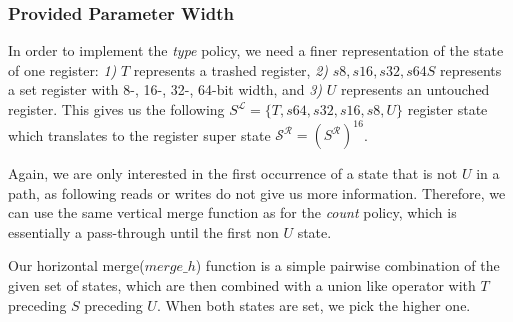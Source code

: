 \subsubsection{Provided Parameter Width}
\label{subsection:providedparamwideness}
In order to implement the \emph{type} policy, we need a finer representation of the state of one register:
\textit{1)} $T$ represents a trashed register,
\textit{2)} $s8, s16, s32, s64 S$ represents a set register with  8-, 16-, 32-, 64-bit width, and
\textit{3)} $U$ represents an untouched register.
This gives us the following $S^\mathcal{L} = \{ T, s64, s32, s16, s8, U \}$ register state which translates to the register 
super state $\mathcal{S}^\mathcal{R} = (S^\mathcal{R})^{16}$.

Again, we are only interested in the first occurrence of a state that is not $U$ in a path, as following reads or writes do not give us more information. Therefore, we can use 
the same vertical merge function as for the \emph{count} policy, which is essentially a pass-through until the first non $U$ state.

Our horizontal merge($merge\_h$) function is a simple pairwise combination of the given set of states, which are then combined with a union like operator with $T$ 
preceding $S$ preceding $U$. When both states are set, we pick the higher one.

